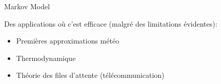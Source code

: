 \begin{frame}{Markov Model}
  \begin{minipage}{0.49\linewidth}
    Des applications où c'est efficace (malgré des limitations évidentes):
    \begin{itemize}
    \item Premières approximations météo
    \item Thermodynamique
    \item Théorie des files d'attente (télécommunication)
    \end{itemize}
  \end{minipage}
  \begin{minipage}{0.49\linewidth}
  \end{minipage}
\end{frame}
